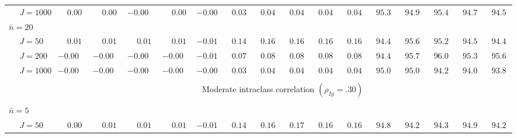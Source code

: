 \begin{sidewaystable}
\begin{threeparttable}
\begin{tabular}{llccccccccccccccc}
 & \nopagebreak $\;J=1000$  & $\phantom{-}0.00\phantom{0}$ & $\phantom{-}0.00\phantom{0}$ & ${-}0.00\phantom{0}$ & $\phantom{-}0.00\phantom{0}$ & ${-}0.00\phantom{0}$ & $\phantom{0}0.03\phantom{0}$ & $\phantom{0}0.04\phantom{0}$ & $\phantom{0}0.04\phantom{0}$ & $\phantom{0}0.04\phantom{0}$ & $\phantom{0}0.04\phantom{0}$ & $\phantom{0}95.3\phantom{0}$ & $\phantom{0}94.9\phantom{0}$ & $\phantom{0}95.4\phantom{0}$ & $\phantom{0}94.7\phantom{0}$ & $\phantom{0}94.5\phantom{0}$ \\
\multicolumn{4}{l}{$\bar{n}=20$} \\  & \nopagebreak $\;J=50$  & $\phantom{-}0.01\phantom{0}$ & $\phantom{-}0.01\phantom{0}$ & $\phantom{-}0.01\phantom{0}$ & $\phantom{-}0.01\phantom{0}$ & ${-}0.01\phantom{0}$ & $\phantom{0}0.14\phantom{0}$ & $\phantom{0}0.16\phantom{0}$ & $\phantom{0}0.16\phantom{0}$ & $\phantom{0}0.16\phantom{0}$ & $\phantom{0}0.16\phantom{0}$ & $\phantom{0}94.4\phantom{0}$ & $\phantom{0}95.6\phantom{0}$ & $\phantom{0}95.2\phantom{0}$ & $\phantom{0}94.5\phantom{0}$ & $\phantom{0}94.4\phantom{0}$ \\
 & \nopagebreak $\;J=200$  & ${-}0.00\phantom{0}$ & ${-}0.00\phantom{0}$ & ${-}0.00\phantom{0}$ & ${-}0.00\phantom{0}$ & ${-}0.01\phantom{0}$ & $\phantom{0}0.07\phantom{0}$ & $\phantom{0}0.08\phantom{0}$ & $\phantom{0}0.08\phantom{0}$ & $\phantom{0}0.08\phantom{0}$ & $\phantom{0}0.08\phantom{0}$ & $\phantom{0}94.4\phantom{0}$ & $\phantom{0}95.7\phantom{0}$ & $\phantom{0}96.0\phantom{0}$ & $\phantom{0}95.3\phantom{0}$ & $\phantom{0}95.6\phantom{0}$ \\
 & \nopagebreak $\;J=1000$  & ${-}0.00\phantom{0}$ & ${-}0.00\phantom{0}$ & ${-}0.00\phantom{0}$ & ${-}0.00\phantom{0}$ & ${-}0.00\phantom{0}$ & $\phantom{0}0.03\phantom{0}$ & $\phantom{0}0.04\phantom{0}$ & $\phantom{0}0.04\phantom{0}$ & $\phantom{0}0.04\phantom{0}$ & $\phantom{0}0.04\phantom{0}$ & $\phantom{0}95.0\phantom{0}$ & $\phantom{0}95.0\phantom{0}$ & $\phantom{0}94.2\phantom{0}$ & $\phantom{0}94.0\phantom{0}$ & $\phantom{0}93.8\phantom{0}$ \\
[0.5ex]\hline\\[-1.6ex] 
& & \multicolumn{15}{c}{Moderate intraclass correlation $(\rho_{Iy}=.30)$} \\[0.6ex]\hline\\[-1.8ex]
\multicolumn{4}{l}{$\bar{n}=5$} \\  & \nopagebreak $\;J=50$  & $\phantom{-}0.00\phantom{0}$ & $\phantom{-}0.01\phantom{0}$ & $\phantom{-}0.01\phantom{0}$ & $\phantom{-}0.01\phantom{0}$ & ${-}0.01\phantom{0}$ & $\phantom{0}0.14\phantom{0}$ & $\phantom{0}0.16\phantom{0}$ & $\phantom{0}0.17\phantom{0}$ & $\phantom{0}0.16\phantom{0}$ & $\phantom{0}0.16\phantom{0}$ & $\phantom{0}94.8\phantom{0}$ & $\phantom{0}94.2\phantom{0}$ & $\phantom{0}94.3\phantom{0}$ & $\phantom{0}94.9\phantom{0}$ & $\phantom{0}94.2\phantom{0}$ \\

\end{tabular}
\end{threeparttable}
\end{sidewaystable}

